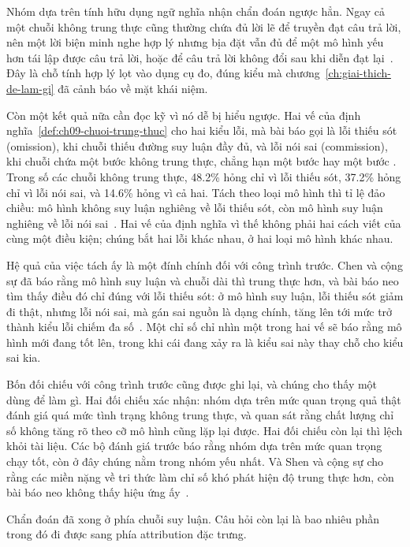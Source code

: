 Nhóm dựa trên tính hữu dụng ngữ nghĩa nhận chẩn đoán ngược hẳn. Ngay cả một
chuỗi không trung thực cũng thường chứa đủ lời lẽ để truyền đạt câu trả lời,
nên một lời biện minh nghe hợp lý nhưng bịa đặt vẫn đủ để một mô hình yếu hơn
tái lập được câu trả lời, hoặc để câu trả lời không đổi sau khi diễn đạt
lại~\autocite{p21metrics}. Đây là chỗ tính hợp lý lọt vào dụng cụ đo, đúng
kiểu mà chương~\ref{ch:giai-thich-de-lam-gi} đã cảnh báo về mặt khái niệm.

Còn một kết quả nữa cần đọc kỹ vì nó dễ bị hiểu ngược. Hai vế của
định nghĩa~\ref{def:ch09-chuoi-trung-thuc} cho hai kiểu lỗi, mà bài báo gọi
là lỗi thiếu sót (omission), khi chuỗi thiếu đường suy luận đầy đủ, và lỗi nói
sai (commission), khi chuỗi chứa một bước không trung thực, chẳng hạn một
bước  hay một bước
. Trong số các chuỗi không trung
thực, 48.2\% hỏng chỉ vì lỗi thiếu sót, 37.2\% hỏng chỉ vì lỗi nói sai, và
14.6\% hỏng vì cả hai. Tách theo loại mô hình thì tỉ lệ đảo chiều: mô hình
không suy luận nghiêng về lỗi thiếu sót, còn mô hình suy luận nghiêng về lỗi
nói sai~\autocite{p21metrics}. Hai vế của định nghĩa vì thế không phải hai
cách viết của cùng một điều kiện; chúng bắt hai lỗi khác nhau, ở hai loại mô
hình khác nhau.

Hệ quả của việc tách ấy là một đính chính đối với công trình trước. Chen và
cộng sự đã báo rằng mô hình suy luận và chuỗi dài thì trung thực hơn, và bài
báo neo tìm thấy điều đó chỉ đúng với lỗi thiếu sót: ở mô hình suy luận, lỗi
thiếu sót giảm đi thật, nhưng lỗi nói sai, mà gán sai nguồn là dạng chính,
tăng lên tới mức trở thành kiểu lỗi chiếm đa số~\autocite{p21metrics}. Một
chỉ số chỉ nhìn một trong hai vế
sẽ báo rằng mô hình mới đang tốt lên, trong khi cái đang xảy ra là kiểu sai
này thay chỗ cho kiểu sai kia.

Bốn đối chiếu với công trình trước cũng được ghi lại, và chúng cho thấy một
 dùng để làm gì. Hai đối chiếu xác nhận: nhóm dựa trên mức quan
trọng quả thật đánh giá quá mức tình trạng không trung thực, và quan sát rằng
chất lượng chỉ số không tăng rõ theo cỡ mô hình cũng lặp lại được. Hai đối
chiếu còn lại thì lệch khỏi tài liệu. Các bộ đánh giá trước báo rằng nhóm dựa
trên mức quan trọng chạy tốt, còn ở đây chúng nằm trong nhóm yếu nhất. Và
Shen và cộng sự cho rằng các miền nặng về tri thức làm chỉ số khó phát hiện độ
trung thực hơn, còn bài báo neo không thấy hiệu ứng ấy~\autocite{p21metrics}.

Chẩn đoán đã xong ở phía chuỗi suy luận. Câu hỏi còn lại là bao nhiêu phần
trong đó đi được sang phía attribution đặc trưng.
